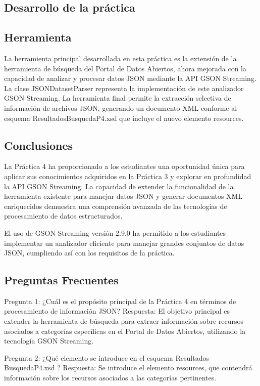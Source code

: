 \subsection{Desarrollo de la práctica}



\subsection{Herramienta}

La herramienta principal desarrollada en esta práctica es la extensión de la herramienta de búsqueda del Portal de Datos Abiertos, ahora mejorada con la capacidad de analizar y procesar datos JSON mediante la API GSON Streaming. La clase JSONDatasetParser representa la implementación de este analizador GSON Streaming. La herramienta final permite la extracción selectiva de información de archivos JSON, generando un documento XML conforme al esquema ResultadosBusquedaP4.xsd que incluye el nuevo elemento resources.

\subsection{Conclusiones}

La Práctica 4 ha proporcionado a los estudiantes una oportunidad única para aplicar sus conocimientos adquiridos en la Práctica 3 y explorar en profundidad la API GSON Streaming. La capacidad de extender la funcionalidad de la herramienta existente para manejar datos JSON y generar documentos XML enriquecidos demuestra una comprensión avanzada de las tecnologías de procesamiento de datos estructurados.

El uso de GSON Streaming versión 2.9.0 ha permitido a los estudiantes implementar un analizador eficiente para manejar grandes conjuntos de datos JSON, cumpliendo así con los requisitos de la práctica.

\subsection{Preguntas Frecuentes}

Pregunta 1: ¿Cuál es el propósito principal de la Práctica 4 en términos de procesamiento de información JSON?
Respuesta: El objetivo principal es extender la herramienta de búsqueda para extraer información sobre recursos asociados a categorías específicas en el Portal de Datos Abiertos, utilizando la tecnología GSON Streaming.

Pregunta 2: ¿Qué elemento se introduce en el esquema Resultados\\BusquedaP4.xsd ?
Respuesta: Se introduce el elemento resources, que contendrá información sobre los recursos asociados a las categorías pertinentes.

